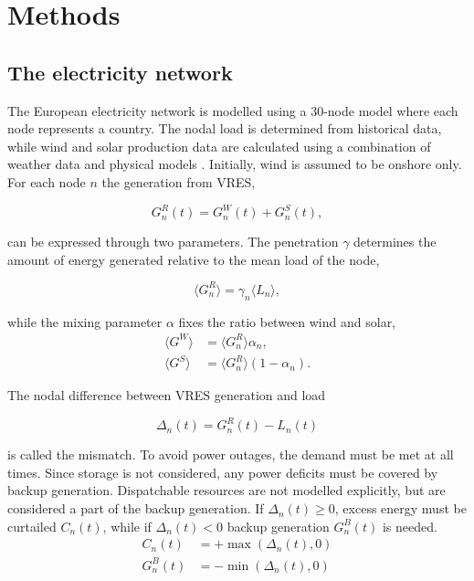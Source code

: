 \documentclass[a4paper, 5p, sort&compress]{elsarticle}%
\newcommand{\mean}[1]{\langle #1 \rangle}
\newcommand{\paren}[1]{\left(#1\right)}
\begin{document}
\section{Methods}
\label{sec:two}
\subsection{The electricity network}

The European electricity network is modelled using a 30-node model
where each node represents a country. The nodal load is determined
from historical data, while wind and solar production data are
calculated using a combination of weather data and physical
models \cite{REA}. Initially, wind is assumed to be onshore only. For
each node $n$ the generation from VRES,

\begin{equation}
  G^{R}_{n}(t) = G_{n}^{W}(t) + G_{n}^{S}(t),
\end{equation} 

can be expressed through two parameters. The penetration $\gamma$
determines the amount of energy generated relative to the mean load of
the node,

\begin{equation}
  \mean{G^{R}_{n}} = \gamma_{n} \mean{L_{n}} ,
\end{equation} 

while the mixing parameter $\alpha$ fixes the ratio between wind and solar,
\begin{align}
  \mean{G^{W}} &= \mean{G_{n}^{R}} \alpha_{n}  , \\
  \mean{G^{S}} &= \mean{G_{n}^{R}} \paren{1- \alpha_{n}}  .
\end{align} 

The nodal difference between VRES generation and load

\begin{equation}
  \Delta_{n}(t) = G^{R}_{n}(t) - L_{n}(t)
\end{equation}

is called the mismatch. To avoid power outages, the demand must be
met at all times. Since storage is not considered, any power
deficits must be covered by backup generation. Dispatchable
resources are not modelled explicitly, but are considered a part of
the backup generation. If $\Delta_{n}(t) \geq 0$, excess energy must be
curtailed $C_{n}(t)$, while if $\Delta_{n}(t) < 0$ backup generation
$G^{B}_{n}(t)$ is needed.
\begin{align}
  C_{n}(t) &= + \max \paren{\Delta_{n}(t),0} \\
  G^{B}_{n}(t) &= - \min \phantom{} \paren{\Delta_{n}(t),0} 
\end{align}
\end{document}
